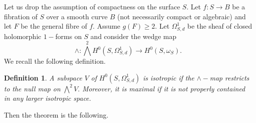 \documentclass[a4paper,11pt]{amsart}
\newtheorem{definition}[theorem]{Definition}
\begin{document}
{ 				Let us drop the assumption of compactness on the surface $S.$ Let $f:S\to B$ be a fibration of $S$ over a smooth curve $B$ (not necessarily compact or algebraic) and let $F$ be the general fibre of $f.$ Assume $g(F)\geq 2.$ 
% 				
			Let $\Omega^1_{S,d}$ be the sheaf of closed holomorphic $1-$forms on $S$ and consider the wedge map 
			\begin{equation}
			\wedge: \bigwedge^2H^0(S,\Omega^1_{S,d})\to H^0(S,\omega_S) .
			\end{equation}
			We recall the following definition. 
			\begin{definition}A subspace $V$ of $H^0(S,\Omega^1_{S,d})$ is {\em isotropic} if the $\wedge-$map restricts to the null map on $\bigwedge^2 V.$ Moreover, it is {\em maximal} if it is not properly contained in any larger isotropic space. 
				\end{definition}
				Then the theorem is the following.
			
}
\end{document}

